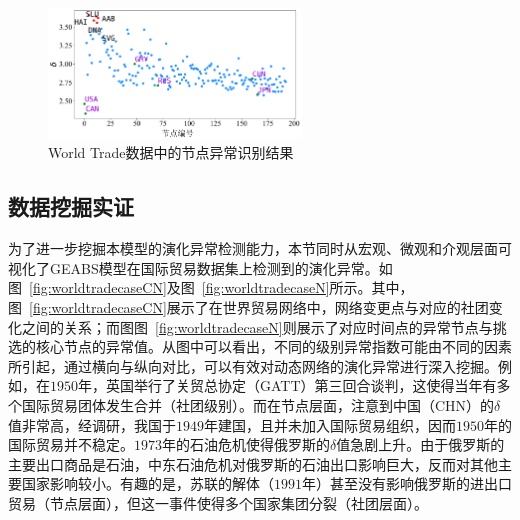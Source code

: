 \begin{figure}[!htbp]
	\centering
	\includegraphics[width=0.6\textwidth]{figures/chap05/worldtradenode-adjusted.pdf}
	\caption{World Trade数据中的节点异常识别结果}
	\label{fig:worldtradenode}
\end{figure}



\subsection{数据挖掘实证}

为了进一步挖掘本模型的演化异常检测能力，本节同时从宏观、微观和介观层面可视化了GEABS模型在国际贸易数据集上检测到的演化异常。如图~\ref{fig:worldtradecaseCN}及图~\ref{fig:worldtradecaseN}所示。其中，图~\ref{fig:worldtradecaseCN}展示了在世界贸易网络中，网络变更点与对应的社团变化之间的关系；而图图~\ref{fig:worldtradecaseN}则展示了对应时间点的异常节点与挑选的核心节点的异常值。从图中可以看出，不同的级别异常指数可能由不同的因素所引起，通过横向与纵向对比，可以有效对动态网络的演化异常进行深入挖掘。例如，在$1950$年，英国举行了关贸总协定（GATT）第三回合谈判，这使得当年有多个国际贸易团体发生合并（社团级别）。而在节点层面，注意到中国（CHN）的$\delta$值非常高，经调研，我国于$1949$年建国，且并未加入国际贸易组织，因而$1950$年的国际贸易并不稳定。$1973$年的石油危机使得俄罗斯的$\delta$值急剧上升。由于俄罗斯的主要出口商品是石油，中东石油危机对俄罗斯的石油出口影响巨大，反而对其他主要国家影响较小。有趣的是，苏联的解体（$1991$年）甚至没有影响俄罗斯的进出口贸易（节点层面），但这一事件使得多个国家集团分裂（社团层面）。

